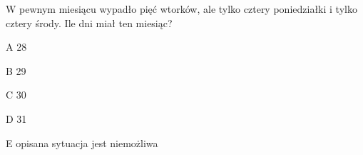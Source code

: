 \begin{tresc}
W pewnym miesiącu wypadło pięć wtorków, ale tylko cztery poniedziałki i tylko cztery środy. Ile dni miał ten miesiąc?
\end{tresc}
\begin{wariant}{A} 28 \end{wariant}
\begin{wariant}{B} 29 \end{wariant}
\begin{wariant}{C} 30 \end{wariant}
\begin{wariant}{D} 31 \end{wariant}
\begin{wariant}{E} opisana sytuacja jest niemożliwa \end{wariant}
